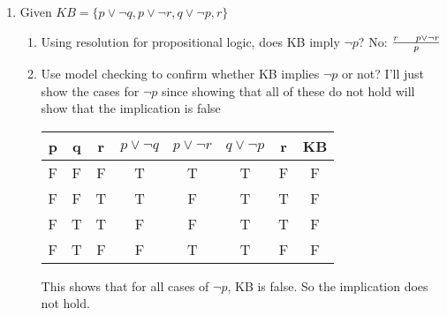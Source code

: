 \documentclass{article}
\begin{document}
\begin{enumerate}
        \newline
        \item Given $KB = \{p\lor \lnot q, p \lor \lnot r, q \lor \lnot p, r \}$
        \begin{enumerate}
            \item Using resolution for propositional logic, does KB imply $\lnot p$?
            \newline
            No:
            \newline
            \newline
            $\frac{r \hspace{0.5cm} p \lor \lnot r} { p }$
            \item Use model checking to confirm whether KB implies $\lnot p$ or not?
            \newline
            \newline
            I'll just show the cases for $\lnot p$ since showing that all of these do not hold will show that the implication is false
            \newline
            \newline
            \begin{center}
             \begin{tabular}{||c | c | c || c | c | c | c || c || } 
             \hline
             p & q & r & $p\lor \lnot q$ & $p\lor \lnot r$ & $q\lor \lnot p$ & r & KB \\ [0.5ex] 
             \hline\hline
             F & F & F & T & T & T & F & F \\ 
             \hline
             F & F & T & T & F & T & T & F \\ 
             \hline
             F & T & T & F & F & T & T & F \\ 
             \hline
             F & T & F & F & T & T & F & F \\ 
             \hline
             \hline
            \end{tabular}
            \end{center}
            \newline
            \newline
            This shows that for all cases of $\lnot p$, KB is false. So the implication does not hold.
        \end{enumerate}
        

\end{enumerate}
\end{document}
